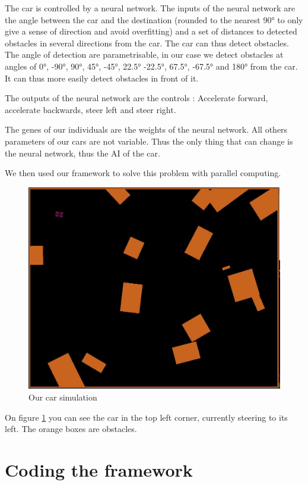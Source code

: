 \documentclass{acm_proc_article-sp}
\begin{document}
The car is controlled by a neural network. The inputs of the neural network are the angle between the car and the destination (rounded to the nearest 90° to only give a sense of direction and avoid overfitting) and a set of distances to detected obstacles in several directions from the car. The car can thus detect obstacles.
The angle of detection are parametrisable, in our case we detect obstacles at angles of 0°, -90°, 90°, 45°, -45°, 22.5° -22.5°, 67.5°, -67.5° and 180° from the car. It can thus more easily detect obstacles in front of it.

The outputs of the neural network are the controls : Accelerate forward, accelerate backwards, steer left and steer right.

The genes of our individuals are the weights of the neural network. All others parameters of our cars are not variable. Thus the only thing that can change is the neural network, thus the AI of the car.

We then used our framework to solve this problem with parallel computing.

\begin{figure}[p]
\centering
\includegraphics[scale=0.5]{./images/cars.jpg}
\caption{Our car simulation}
\label{fig1}
\end{figure}

On figure \ref{fig1} you can see the car in the top left corner, currently steering to its left. The orange boxes are obstacles.

\section{Coding the framework}
\end{document}
